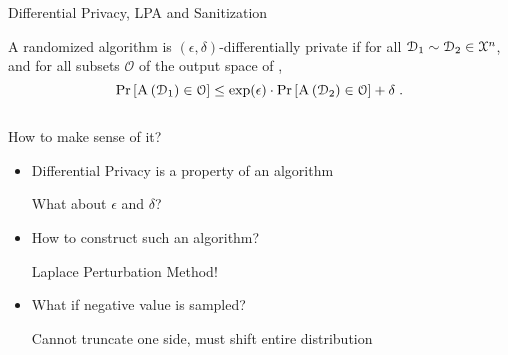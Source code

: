 	\begin{frame}{Differential Privacy, LPA and Sanitization}

		\begin{definition}
			\justify%

			A randomized algorithm  is $(\epsilon, \delta)$-differentially private if for all $\mathcal{D}_1 \sim \mathcal{D}_2 \in \mathcal{X}^{n}$, and for all subsets $\mathcal{O}$ of the output space of ,
			\[
				\probability{ \algo{A}{ \database_1 } \in \mathcal{O} } \leq \exp(\epsilon) \cdot \probability{ \algo{A}{ \database_2 } \in \mathcal{O} } + \delta \; .
			\]
		\end{definition}

		\pause%

		\begin{columns}[T,onlytextwidth]

				\begin{block}{How to make sense of it?}
					\begin{itemize}
						\item<2->
							Differential Privacy is a property of an algorithm \\
							\begin{small}
								What about $\epsilon$ and $\delta$?
							\end{small}
						\item<3->
							How to construct such an algorithm? \\
							\begin{small}
								Laplace Perturbation Method!
							\end{small}
						\item<4->
							What if negative value is sampled? \\
							\begin{small}
								Cannot truncate one side, must shift entire distribution
							\end{small}
					\end{itemize}
				\end{block}


				\centering

		\end{columns}

	\end{frame}

